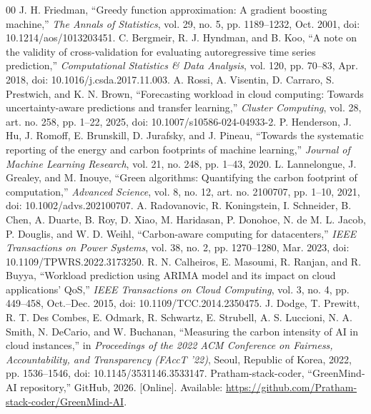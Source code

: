 \documentclass[conference]{IEEEtran}
\begin{document}
\begin{thebibliography}{00}
 J. H. Friedman, ``Greedy function approximation: A gradient boosting machine,'' \emph{The Annals of Statistics}, vol. 29, no. 5, pp. 1189--1232, Oct. 2001, doi: 10.1214/aos/1013203451.
 C. Bergmeir, R. J. Hyndman, and B. Koo, ``A note on the validity of cross-validation for evaluating autoregressive time series prediction,'' \emph{Computational Statistics \& Data Analysis}, vol. 120, pp. 70--83, Apr. 2018, doi: 10.1016/j.csda.2017.11.003.
 A. Rossi, A. Visentin, D. Carraro, S. Prestwich, and K. N. Brown, ``Forecasting workload in cloud computing: Towards uncertainty-aware predictions and transfer learning,'' \emph{Cluster Computing}, vol. 28, art. no. 258, pp. 1--22, 2025, doi: 10.1007/s10586-024-04933-2.
 P. Henderson, J. Hu, J. Romoff, E. Brunskill, D. Jurafsky, and J. Pineau, ``Towards the systematic reporting of the energy and carbon footprints of machine learning,'' \emph{Journal of Machine Learning Research}, vol. 21, no. 248, pp. 1--43, 2020.
 L. Lannelongue, J. Grealey, and M. Inouye, ``Green algorithms: Quantifying the carbon footprint of computation,'' \emph{Advanced Science}, vol. 8, no. 12, art. no. 2100707, pp. 1--10, 2021, doi: 10.1002/advs.202100707.
 A. Radovanovic, R. Koningstein, I. Schneider, B. Chen, A. Duarte, B. Roy, D. Xiao, M. Haridasan, P. Donohoe, N. de M. L. Jacob, P. Douglis, and W. D. Weihl, ``Carbon-aware computing for datacenters,'' \emph{IEEE Transactions on Power Systems}, vol. 38, no. 2, pp. 1270--1280, Mar. 2023, doi: 10.1109/TPWRS.2022.3173250.
 R. N. Calheiros, E. Masoumi, R. Ranjan, and R. Buyya, ``Workload prediction using ARIMA model and its impact on cloud applications' QoS,'' \emph{IEEE Transactions on Cloud Computing}, vol. 3, no. 4, pp. 449--458, Oct.--Dec. 2015, doi: 10.1109/TCC.2014.2350475.
 J. Dodge, T. Prewitt, R. T. Des Combes, E. Odmark, R. Schwartz, E. Strubell, A. S. Luccioni, N. A. Smith, N. DeCario, and W. Buchanan, ``Measuring the carbon intensity of AI in cloud instances,'' in \emph{Proceedings of the 2022 ACM Conference on Fairness, Accountability, and Transparency (FAccT '22)}, Seoul, Republic of Korea, 2022, pp. 1536--1546, doi: 10.1145/3531146.3533147.
 Pratham-stack-coder, ``GreenMind-AI repository,'' GitHub, 2026. [Online]. Available: \url{https://github.com/Pratham-stack-coder/GreenMind-AI}.
\end{thebibliography}
\end{document}
